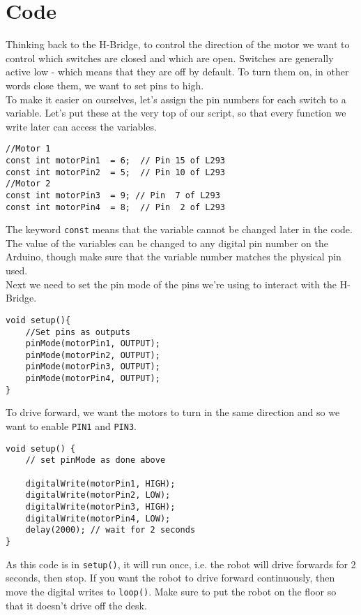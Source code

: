 \documentclass[../TinyBot.tex]{subfiles}
\begin{document}
\section{Code}





Thinking back to the H-Bridge, to control the direction of the motor we want to control which switches are closed and which are open. Switches are generally active low - which means that they are off by default. To turn them on, in other words close them, we want to set pins to high. \\

To make it easier on ourselves, let's assign the pin numbers for each switch to a variable. Let's put these at the very top of our script, so that every function we write later can access the variables. 

\begin{lstlisting}
//Motor 1
const int motorPin1  = 6;  // Pin 15 of L293
const int motorPin2  = 5;  // Pin 10 of L293
//Motor 2
const int motorPin3  = 9; // Pin  7 of L293
const int motorPin4  = 8;  // Pin  2 of L293
\end{lstlisting}

The keyword \lstinline[]!const! means that the variable cannot be changed later in the code. 
The value of the variables can be changed to any digital pin number on the Arduino, though make sure that the variable number matches the physical pin used. \\


Next we need to set the pin mode of the pins we're using to interact with the H-Bridge.

\begin{lstlisting}
void setup(){
    //Set pins as outputs
    pinMode(motorPin1, OUTPUT);
    pinMode(motorPin2, OUTPUT);
    pinMode(motorPin3, OUTPUT);
    pinMode(motorPin4, OUTPUT);
}
\end{lstlisting}


To drive forward, we want the motors to turn in the same direction and so we want to enable \lstinline[]!PIN1! and \lstinline[]!PIN3!. 

\begin{lstlisting}
void setup() {
    // set pinMode as done above

    digitalWrite(motorPin1, HIGH);
    digitalWrite(motorPin2, LOW);
    digitalWrite(motorPin3, HIGH);
    digitalWrite(motorPin4, LOW);
    delay(2000); // wait for 2 seconds
}
\end{lstlisting}
As this code is in \lstinline[]!setup()!, it will run once, i.e. the robot will drive forwards for 2 seconds, then stop. If you want the robot to drive forward continuously, then move the digital writes to \lstinline[]!loop()!. Make sure to put the robot on the floor so that it doesn't drive off the desk.
\end{document}

